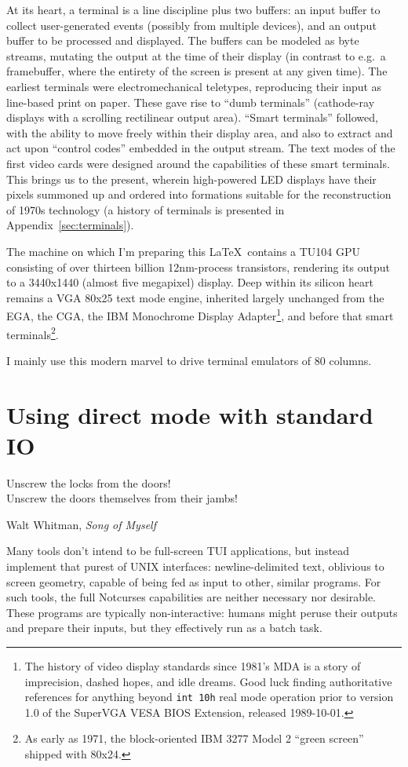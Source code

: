 \documentclass[letterpaper,10pt]{article}
\begin{document}
At its heart, a terminal is a line discipline plus two buffers: an input buffer
to collect user-generated events (possibly from multiple devices), and an
output buffer to be processed and displayed. The buffers can be modeled as byte
streams, mutating the output at the time of their display (in contrast to e.g.\
a framebuffer, where the entirety of the screen is present at any given time).
The earliest terminals were electromechanical teletypes, reproducing their
input as line-based print on paper. These gave rise to ``dumb terminals''
(cathode-ray displays with a scrolling rectilinear output area). ``Smart
terminals'' followed, with the ability to move freely within their display
area, and also to extract and act upon ``control codes'' embedded in the output
stream. The text modes of the first video cards were designed around the
capabilities of these smart terminals. This brings us to the present, wherein
high-powered LED displays have their pixels summoned up and ordered into
formations suitable for the reconstruction of 1970s technology (a history of
terminals is presented in Appendix~\ref{sec:terminals}).

The machine on which I'm preparing this \LaTeX\ contains a
TU104 GPU consisting of over thirteen billion 12nm-process transistors,
rendering its output to a 3440x1440 (almost five megapixel) display. Deep
within its silicon heart remains a VGA 80x25 text mode engine\cite{vga}, inherited
largely unchanged from the EGA, the CGA, the IBM Monochrome Display Adapter\footnote{The
history of video display standards since 1981's MDA is a story of imprecision,
dashed hopes, and idle dreams. Good luck finding authoritative references
for anything beyond \texttt{int 10h} real mode operation prior to version 1.0
of the SuperVGA VESA BIOS Extension\cite{videostandards}, released 1989-10-01\cite{vesa}.},
and before that smart terminals\footnote{As early as 1971, the block-oriented
IBM 3277 Model 2 ``green screen'' shipped with 80x24.}.


I mainly use this modern marvel to drive terminal emulators of 80 columns.

\cleardoublepage

\section{Using direct mode with standard I\/O}
\label{sec:direct}
\epigraph{Unscrew the locks from the doors!\\Unscrew the doors themselves from their jambs!}{Walt Whitman, \textit{Song of Myself}}
Many tools don't intend to be full-screen TUI applications, but instead
implement that purest of UNIX interfaces: newline-delimited text, oblivious
to screen geometry, capable of being fed as input to other, similar programs.
For such tools, the full Notcurses capabilities are neither necessary nor
desirable. These programs are typically non-interactive: humans might peruse
their outputs and prepare their inputs, but they effectively run as a batch
task.
\end{document}
